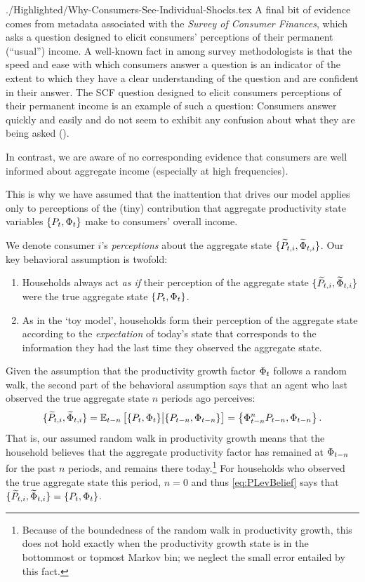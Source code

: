 \begin{verbatimwrite}{./Highlighted/Why-Consumers-See-Individual-Shocks.tex}
A final bit of evidence comes from metadata associated with the \textit{Survey of Consumer Finances}, which asks a question designed to elicit consumers' perceptions of their permanent (``usual'') income.  A well-known fact in among survey methodologists is that the speed and ease with which consumers answer a question is an indicator of the extent to which they have a clear understanding of the question and are confident in their answer.  The SCF question designed to elicit consumers perceptions of their permanent income is an example of such a question: Consumers answer quickly and easily and do not seem to exhibit any confusion about what they are being asked (\cite{kennickellPermanent}).

In contrast, we are aware of no corresponding evidence that consumers are well informed about aggregate income (especially at high frequencies).%
\end{verbatimwrite}%

This is why we have assumed that the inattention that drives our model applies only to perceptions of the (tiny) contribution that aggregate productivity state variables $\{P_t,\Phi_t\}$ make to consumers' overall income.

We denote consumer $i$'s \textit{perceptions} about the aggregate state $\{\widetilde{P}_{t,i},\widetilde{\Phi}_{t,i}\}$.  Our key behavioral assumption is twofold:
\begin{enumerate}
\item Households always act \textit{as if} their perception of the aggregate state $\{\widetilde{P}_{t,i},\widetilde{\Phi}_{t,i}\}$ were the true aggregate state $\{P_t,\Phi_t\}$.

\item As in the `toy model', households form their perception of the aggregate state according to the \textit{expectation} of today's state that corresponds to the information they had the last time they observed the aggregate state.
\end{enumerate}
Given the assumption that the productivity growth factor $\Phi_t$ follows a random walk,
the second part of the behavioral assumption says that an agent who last observed the true
aggregate state $n$ periods ago perceives:
\begin{equation}\label{eq:PLevBelief}
\{\widetilde{P}_{t,i},\widetilde{\Phi}_{t,i}\} = \operatorname{\mathbb{E}}_{t-n}\big[\{P_t,\Phi_t\} \big| \{P_{t-n},\Phi_{t-n}\}\big] = \left\{\Phi_{t-n}^{n} P_{t-n},\Phi_{t-n}\right\}.
\end{equation}
That is, our assumed random walk in productivity growth means that the household believes that the aggregate productivity factor has remained at $\Phi_{t-n}$ for the past $n$ periods, and remains there today.\footnote{Because of the boundedness of the random walk in productivity growth, this does not hold exactly when the productivity growth state is in the bottommost or topmost Markov bin; we neglect the small error entailed by this fact.}  For households who observed the true aggregate state this period, $n=0$ and thus \eqref{eq:PLevBelief} says that $\{\widetilde{P}_{t,i},\widetilde{\Phi}_{t,i}\} = \{P_t,\Phi_t\}$.

